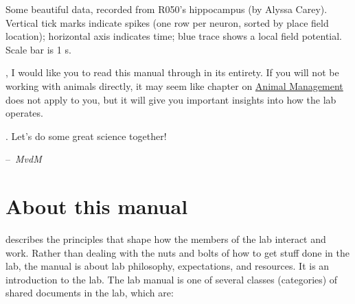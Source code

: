 \documentclass{tufte-book}
\makeatletter
\newenvironment{chapquote}[2][2em]
  {\setlength{\@tempdima}{#1}%
   \def\chapquote@author{#2}%
   \parshape 1 \@tempdima \dimexpr\textwidth-2\@tempdima\relax%
   \itshape}
  {\par\normalfont\hfill--\ \chapquote@author\hspace*{\@tempdima}\par\bigskip}
\makeatother
\begin{document}
\begin{marginfigure}
\caption{Some beautiful data, recorded from R050's hippocampus (by
  Alyssa Carey). Vertical tick marks indicate spikes (one row per
  neuron, sorted by place field location); horizontal axis indicates
  time; blue trace shows a local field potential. Scale bar is 1 s.}
\label{fig:raster}
\end{marginfigure}

, I would like you to read this
manual through in its entirety. If you will not be working with
animals directly, it may seem like chapter on
\hyperref[sec:animal-management]{Animal Management} does not apply to
you, but it will give you important insights into how the lab
operates.

. Let's do some great science together!

\begin{chapquote}{{\it MvdM}}
\end{chapquote}
\mainmatter

\chapter{About this manual}

 describes the principles that shape how the
members of the lab interact and work. Rather than dealing with the
nuts and bolts of how to get stuff done in the lab, the manual is
about lab philosophy, expectations, and resources. It is an
introduction to the lab. The lab manual is one of several classes
(categories) of shared documents in the lab, which are:
\end{document}
